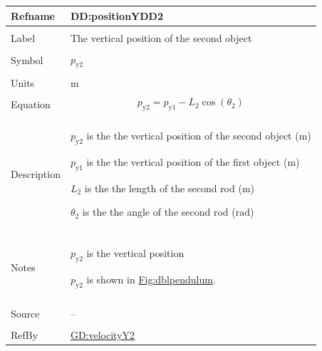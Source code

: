 \documentclass[12pt]{article}
\begin{document}
\vspace{\baselineskip}
\noindent
\begin{minipage}{\textwidth}
\begin{tabular}{>{\raggedright}p{}>{\raggedright\arraybackslash}p{}}
\toprule \textbf{Refname} & \textbf{DD:positionYDD2}
\label{DD:positionYDD2}
\\ \midrule \\
Label & The vertical position of the second object
        
\\ \midrule \\
Symbol & ${p_{\text{y}2}}$
         
\\ \midrule \\
Units & ${\text{m}}$
        
\\ \midrule \\
Equation & \begin{displaymath}
           {p_{\text{y}2}}={p_{\text{y}1}}-{L_{2}} \cos\left({θ_{2}}\right)
           \end{displaymath}
\\ \midrule \\
Description & \begin{symbDescription}
              \item{${p_{\text{y}2}}$ is the the vertical position of the second object (${\text{m}}$)}
              \item{${p_{\text{y}1}}$ is the the vertical position of the first object (${\text{m}}$)}
              \item{${L_{2}}$ is the the length of the second rod (${\text{m}}$)}
              \item{${θ_{2}}$ is the the angle of the second rod (${\text{rad}}$)}
              \end{symbDescription}
\\ \midrule \\
Notes & ${p_{\text{y}2}}$ is the vertical position
        
        ${p_{\text{y}2}}$ is shown in \hyperref[Figure:dblpendulum]{Fig:dblpendulum}.
        
\\ \midrule \\
Source & --
         
\\ \midrule \\
RefBy & \hyperref[GD:velocityY2]{GD:velocityY2}
        
\\ \bottomrule
\end{tabular}
\end{minipage}
\end{document}
